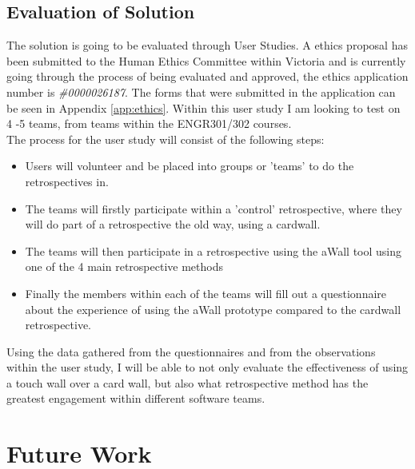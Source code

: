 \documentclass[11pt
              , a4paper
              , twoside
              , openright
              ]{report}
\begin{document}
\section{Evaluation of Solution}
The solution is going to be evaluated through User Studies. A ethics proposal has been submitted to the Human Ethics Committee within Victoria and is currently going through the process of being evaluated and approved, the ethics application number is \textit{\#0000026187}. The forms that were submitted in the application can be seen in Appendix \ref{app:ethics}. Within this user study I am looking to test on 4 -5 teams, from teams within the ENGR301/302 courses. \\
The process for the user study will consist of the following steps:
\begin{itemize}
	\item Users will volunteer and be placed into groups or 'teams' to do the retrospectives in.
	\item The teams will firstly participate within a 'control' retrospective, where they will do part of a retrospective the old way, using a cardwall.
	\item The teams will then participate in a retrospective using the aWall tool using one of the 4 main retrospective methods
	\item Finally the members within each of the teams will fill out a questionnaire about the experience of using the aWall prototype compared to the cardwall retrospective.
\end{itemize}

Using the data gathered from the questionnaires and from the observations within the user study, I will be able to not only evaluate the effectiveness of using a touch wall over a card wall, but also what retrospective method has the greatest engagement within different software teams. 

\chapter{Future Work}\label{C:future}
\end{document}
